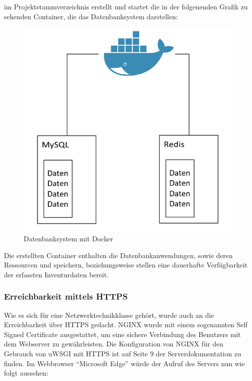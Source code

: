 im Projektstammverzeichnis erstellt und startet die in der folgenenden
Grafik zu sehenden Container, die das Datenbanksystem darstellen:

\begin{figure}[ht]
\centering
\includegraphics{docker.png}
\caption{Datenbanksystem mit Docker}
\end{figure}

Die erstellten Container enthalten die Datenbankanwendungen, sowie deren
Ressourcen und speichern, beziehungsweise stellen eine dauerhafte
Verfügbarkeit der erfassten Inventurdaten bereit.

\hypertarget{erreichbarkeit-mittels-https}{%
\subsubsection{Erreichbarkeit mittels
HTTPS}\label{erreichbarkeit-mittels-https}}

Wie es sich für eine Netzwerktechnikklasse gehört, wurde auch an die
Erreichbarkeit über HTTPS gedacht. NGINX wurde mit einem sogenannten
Self Signed Certificate ausgestattet, um eine sichere Verbindung des
Benutzers mit dem Webserver zu gewährleisten. Die Konfiguration von
NGINX für den Gebrauch von uWSGI mit HTTPS ist auf Seite 9 der
Serverdokumentation zu finden. Im Webbrowser ``Microsoft Edge'' würde
der Aufruf des Servers nun wie folgt aussehen:


